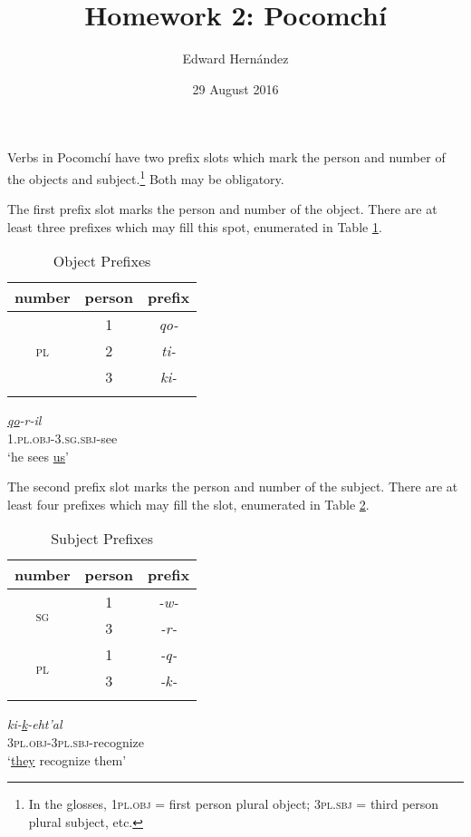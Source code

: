 \documentclass[doc,12pt]{apa6}
\begin{document}
\title{Homework 2: Pocomch\'{i}}
\author{Edward Hern\'{a}ndez}
\date{29 August 2016}
\maketitle

\setcounter{secnumdepth}{3}

Verbs in Pocomch\'{i} have two prefix slots which mark the person and number of
the objects and subject.\footnote{
	In the glosses, \textsc{1pl.obj} = first person plural object;
	\textsc{3pl.sbj} = third person plural subject, etc.
}
Both may be obligatory.

The first prefix slot marks the person and number of the object. There are at
least three prefixes which may fill this spot, enumerated in Table
\ref{table:obj}.
\begin{table}
	\begin{tabular}{ c c c }
		\textbf{number} & \textbf{person} & \textbf{prefix} \\ \hline
		\multirow{ 3}{*}{\textsc{pl}} & 1 & \textit{qo-} \\ \cline{2-3}
		& 2 & \textit{ti-} \\ \cline{2-3}
		& 3 & \textit{ki-} \\ \hline \\
	\end{tabular} 
	\caption{Object Prefixes}
	\label{table:obj}
\end{table}
\begin{exe}
	\ex
	\gll \textit{\underline{qo}-r-il} \\
	\textsc{1.pl.obj-3.sg.sbj-}see \\
	\trans `he sees \underline{us}'
\end{exe}

The second prefix slot marks the person and number of the subject. There are at
least four prefixes which may fill the slot, enumerated in Table
\ref{table:sbj}.
\begin{table}
	\begin{tabular}{ c c c }
		\textbf{number} & \textbf{person} & \textbf{prefix} \\ \hline
		\multirow{ 2}{*}{\textsc{sg}} & 1 & \textit{-w-} \\ \cline{2-3}
		& 3 & \textit{-r-} \\ \hline
		\multirow{ 2}{*}{\textsc{pl}} & 1 & \textit{-q-} \\ \cline{2-3}
		& 3 & \textit{-k-} \\ \hline \\
	\end{tabular} 
	\caption{Subject Prefixes}
	\label{table:sbj}
\end{table}
\begin{exe}
	\ex
	\gll \textit{ki-\underline{k}-eht'al} \\
	\textsc{3pl.obj-3pl.sbj}-recognize \\
	\trans `\underline{they} recognize them'
\end{exe}
\end{document}
